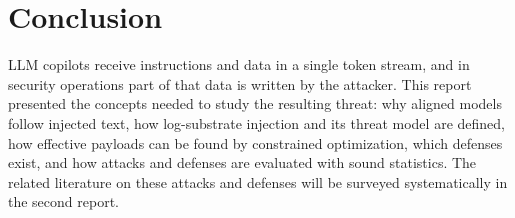 \section{Conclusion}

LLM copilots receive instructions and data in a single token stream, and in security operations part of that data is written by the attacker. This report presented the concepts needed to study the resulting threat: why aligned models follow injected text, how log-substrate injection and its threat model are defined, how effective payloads can be found by constrained optimization, which defenses exist, and how attacks and defenses are evaluated with sound statistics. The related literature on these attacks and defenses will be surveyed systematically in the second report.
